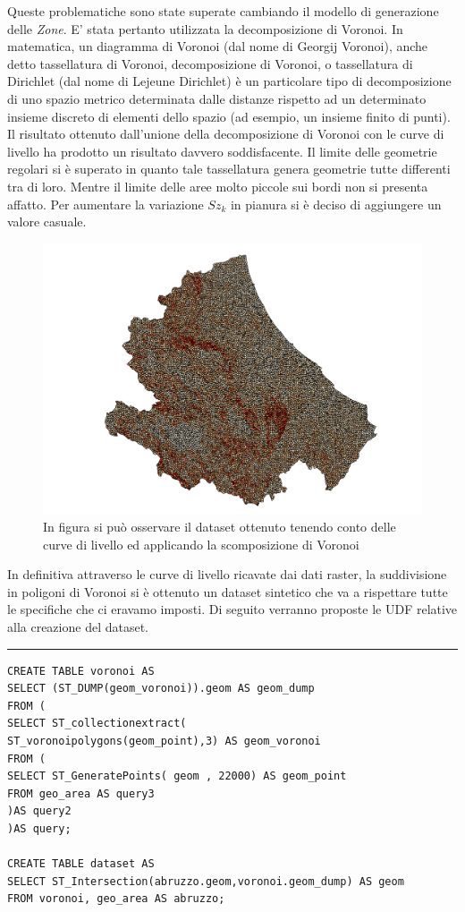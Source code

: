 Queste problematiche sono state superate cambiando il modello di generazione delle \textit{Zone}. E' stata pertanto utilizzata la decomposizione di Voronoi. In matematica, un diagramma di Voronoi (dal nome di Georgij Voronoi), anche detto tassellatura di Voronoi, decomposizione di Voronoi, o tassellatura di Dirichlet (dal nome di Lejeune Dirichlet) è un particolare tipo di decomposizione di uno spazio metrico determinata dalle distanze rispetto ad un determinato insieme discreto di elementi dello spazio (ad esempio, un insieme finito di punti). 
Il risultato ottenuto dall'unione della decomposizione di Voronoi con le curve di livello ha prodotto un risultato davvero soddisfacente. Il limite delle geometrie regolari si è superato in quanto tale tassellatura genera geometrie tutte differenti tra di loro. Mentre il limite delle aree molto piccole sui bordi non si presenta affatto.
Per aumentare la variazione $Sz_k$ in pianura si è deciso di aggiungere un valore casuale.
\begin{figure}[h]
	\centering
	\includegraphics[width=1\textwidth]{images/voronoi.png}
	\caption{In figura si può osservare il dataset ottenuto tenendo conto delle curve di livello ed applicando la scomposizione di Voronoi}
	\label{fig:diagrammaER}
\end{figure}
In definitiva attraverso le curve di livello ricavate dai dati raster, la suddivisione in poligoni di Voronoi si è ottenuto un dataset sintetico che va a rispettare tutte le specifiche che ci eravamo imposti. Di seguito verranno proposte le UDF relative alla creazione del dataset.
\newpage
\hrule
\begin{lstlisting}
CREATE TABLE voronoi AS
SELECT (ST_DUMP(geom_voronoi)).geom AS geom_dump 
FROM (
SELECT ST_collectionextract(
ST_voronoipolygons(geom_point),3) AS geom_voronoi
FROM (
SELECT ST_GeneratePoints( geom , 22000) AS geom_point
FROM geo_area AS query3 
)AS query2
)AS query;

CREATE TABLE dataset AS
SELECT ST_Intersection(abruzzo.geom,voronoi.geom_dump) AS geom
FROM voronoi, geo_area AS abruzzo;



\end{lstlisting}
